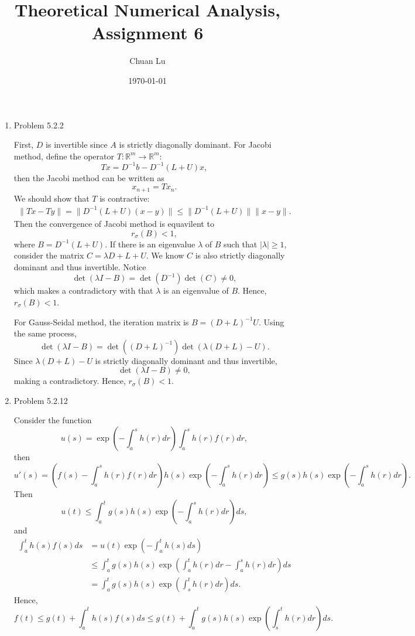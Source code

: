 \documentclass{article}%
\newcommand{\lv}{\lVert}
\newcommand{\rv}{\rVert}
\begin{document}
\title{Theoretical Numerical Analysis, Assignment 6}
\author{Chuan Lu}
\date{\today}
\maketitle

\begin{enumerate}

\item Problem 5.2.2

First, $D$ is invertible since $A$ is strictly diagonally dominant. For Jacobi method, define the operator $T: \mathbb{R}^m\to \mathbb{R}^m $:
$$
Tx = D^{-1}b - D^{-1}(L+U)x,
$$
then the Jacobi method can be written as 
$$
x_{n+1} = Tx_{n}.
$$
We should show that $T$ is contractive:
$$
\begin{aligned}
\lv Tx - Ty\rv = \lv D^{-1}(L+U)(x-y)\rv \le \lv D^{-1}(L+U)\rv \lv x-y\rv.
\end{aligned}
$$
Then the convergence of Jacobi method is equavilent to 
$$
r_\sigma(B) < 1,
$$
where $B = D^{-1}(L+U) $. If there is an eigenvalue $\lambda $ of $B$ such that $|\lambda| \ge 1$, consider the matrix $C = \lambda D + L + U$. We know $C$ is also strictly diagonally dominant and thus invertible. Notice
$$
\det(\lambda I - B) = \det(D^{-1})\det(C) \ne 0,
$$
which makes a contradictory with that $\lambda$ is an eigenvalue of $B$. Hence, $r_\sigma(B) < 1 $.

For Gauss-Seidal method, the iteration matrix is $B = (D+L)^{-1}U $. Using the same process,
$$
\det(\lambda I - B) = \det((D+L)^{-1} )\det(\lambda(D+L) - U).
$$
Since $\lambda (D+L) - U$ is strictly diagonally dominant and thus invertible,
$$
\det(\lambda I - B)\ne 0,
$$
making a contradictory. Hence, $r_\sigma(B) < 1 $.


\item Problem 5.2.12

Consider the function
$$
u(s) = \exp(-\int_{a}^{s}h(r)dr)\int_{a}^{s} h(r) f(r)dr,
$$
then
$$
u'(s) = (f(s) - \int_{a}^{s}h(r)f(r)dr)h(s)\exp(-\int_{a}^{s} h(r)dr) \le g(s)h(s)\exp(-\int_{a}^{s} h(r)dr).
$$
Then
$$
u(t) \le \int_{a}^{t} g(s)h(s)\exp(-\int_{a}^{s} h(r)dr)ds,
$$
and
$$
\begin{aligned}
\int_{a}^{t}h(s)f(s)ds &= u(t)\exp(-\int_{a}^t h(s)ds)\\
&\le \int_{a}^{t}g(s)h(s)\exp(\int_{a}^{t}h(r)dr - \int_{a}^{s}h(r)dr)ds \\
&= \int_{a}^{t}g(s)h(s)\exp(\int_{s}^{t}h(r)dr)ds.
\end{aligned}
$$
Hence,
$$
f(t)\le g(t) + \int_{a}^{t} h(s)f(s)ds \le g(t) + \int_{a}^{t}g(s)h(s)\exp(\int_{s}^{t}h(r)dr)ds.
$$


\end{enumerate}
\end{document}
